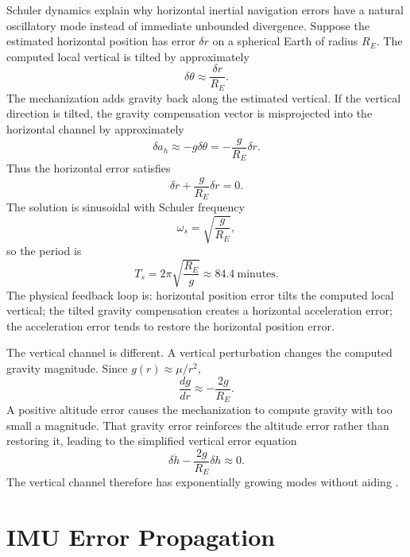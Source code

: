 \documentclass[11pt,oneside]{book}
\begin{document}
Schuler dynamics explain why horizontal inertial navigation errors have a natural oscillatory mode instead of immediate unbounded divergence. Suppose the estimated horizontal position has error $\delta r$ on a spherical Earth of radius $R_E$. The computed local vertical is tilted by approximately
\begin{equation}
\delta\theta \approx \frac{\delta r}{R_E}.
\end{equation}
The mechanization adds gravity back along the estimated vertical. If the vertical direction is tilted, the gravity compensation vector is misprojected into the horizontal channel by approximately
\begin{equation}
\delta a_h\approx -g\delta\theta=-\frac{g}{R_E}\delta r.
\end{equation}
Thus the horizontal error satisfies
\begin{equation}
\delta\ddot r+\frac{g}{R_E}\delta r=0.
\end{equation}
The solution is sinusoidal with Schuler frequency
\begin{equation}
\omega_s=\sqrt{\frac{g}{R_E}},
\end{equation}
so the period is
\begin{equation}
T_s=2\pi\sqrt{\frac{R_E}{g}}\approx 84.4\ \mathrm{minutes}.
\end{equation}
The physical feedback loop is: horizontal position error tilts the computed local vertical; the tilted gravity compensation creates a horizontal acceleration error; the acceleration error tends to restore the horizontal position error.

The vertical channel is different. A vertical perturbation changes the computed gravity magnitude. Since $g(r)\approx \mu/r^2$,
\begin{equation}
\frac{dg}{dr}\approx -\frac{2g}{R_E}.
\end{equation}
A positive altitude error causes the mechanization to compute gravity with too small a magnitude. That gravity error reinforces the altitude error rather than restoring it, leading to the simplified vertical error equation
\begin{equation}
\delta\ddot h-\frac{2g}{R_E}\delta h\approx 0.
\end{equation}
The vertical channel therefore has exponentially growing modes without aiding \cite{titterton2004,groves2013}.

\section{IMU Error Propagation}
\end{document}
